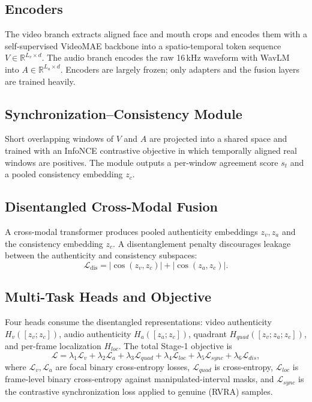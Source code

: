 \subsection{Encoders}
The video branch extracts aligned face and mouth crops and encodes them with a
self-supervised VideoMAE backbone into a spatio-temporal token sequence
$V \in \mathbb{R}^{L_v \times d}$. The audio branch encodes the raw 16\,kHz
waveform with WavLM~\cite{chen2022wavlm} into
$A \in \mathbb{R}^{L_a \times d}$. Encoders are largely frozen; only adapters and
the fusion layers are trained heavily.

\subsection{Synchronization--Consistency Module}
Short overlapping windows of $V$ and $A$ are projected into a shared space and
trained with an InfoNCE contrastive objective in which temporally aligned
real windows are positives. The module outputs a per-window agreement score
$s_t$ and a pooled consistency embedding $z_c$.

\subsection{Disentangled Cross-Modal Fusion}
A cross-modal transformer produces pooled authenticity embeddings $z_v, z_a$ and
the consistency embedding $z_c$. A disentanglement penalty discourages leakage
between the authenticity and consistency subspaces:
\begin{equation}
  \mathcal{L}_{\text{dis}} = \left|\cos(z_v, z_c)\right| + \left|\cos(z_a, z_c)\right|.
\end{equation}

\subsection{Multi-Task Heads and Objective}
Four heads consume the disentangled representations: video authenticity
$H_v([z_v; z_c])$, audio authenticity $H_a([z_a; z_c])$, quadrant
$H_{quad}([z_v; z_a; z_c])$, and per-frame localization $H_{loc}$. The total
Stage-1 objective is
\begin{equation}
  \mathcal{L} = \lambda_1 \mathcal{L}_v + \lambda_2 \mathcal{L}_a
  + \lambda_3 \mathcal{L}_{quad} + \lambda_4 \mathcal{L}_{loc}
  + \lambda_5 \mathcal{L}_{sync} + \lambda_6 \mathcal{L}_{dis},
\end{equation}
where $\mathcal{L}_v, \mathcal{L}_a$ are focal binary cross-entropy losses,
$\mathcal{L}_{quad}$ is cross-entropy, $\mathcal{L}_{loc}$ is frame-level binary
cross-entropy against manipulated-interval masks, and $\mathcal{L}_{sync}$ is the
contrastive synchronization loss applied to genuine (RVRA) samples.

